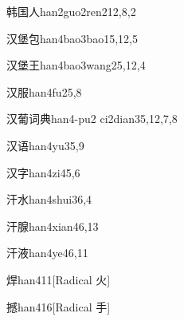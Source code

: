 \begin{entry}{韩国人}{han2guo2ren2}{12,8,2}
\end{entry}

\begin{entry}{汉堡包}{han4bao3bao1}{5,12,5}
\end{entry}

\begin{entry}{汉堡王}{han4bao3wang2}{5,12,4}
\end{entry}

\begin{entry}{汉服}{han4fu2}{5,8}
\end{entry}

\begin{entry}{汉葡词典}{han4-pu2 ci2dian3}{5,12,7,8}
\end{entry}

\begin{entry}{汉语}{han4yu3}{5,9}
\end{entry}

\begin{entry}{汉字}{han4zi4}{5,6}
\end{entry}

\begin{entry}{汗水}{han4shui3}{6,4}
\end{entry}

\begin{entry}{汗腺}{han4xian4}{6,13}
\end{entry}

\begin{entry}{汗液}{han4ye4}{6,11}
\end{entry}

\begin{entry}{焊}{han4}{11}[Radical 火]
\end{entry}

\begin{entry}{撼}{han4}{16}[Radical 手]
\end{entry}

